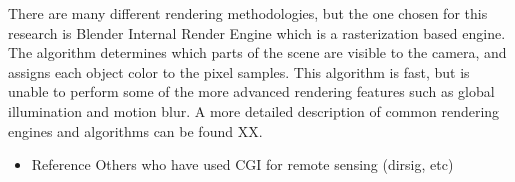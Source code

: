 There are many different rendering methodologies, but the one chosen for this research is Blender Internal Render Engine which is a rasterization based engine.  The algorithm determines which parts of the scene are visible to the camera, and assigns each object color to the pixel samples.  This algorithm is fast, but is unable to perform some of the more advanced rendering features such as global illumination and motion blur.  A more detailed description of common rendering engines and algorithms can be found XX.

\begin{itemize}
	\item Reference Others who have used CGI for remote sensing (dirsig, etc) 
\end{itemize}